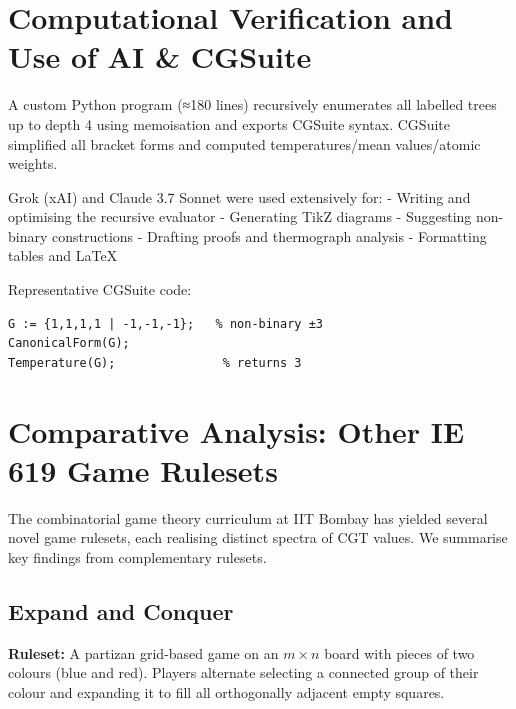 \documentclass[10pt,a4paper,twocolumn]{article}
\theoremstyle{plain}
\theoremstyle{definition}
\theoremstyle{remark}
\begin{document}
\section{Computational Verification and Use of AI \& CGSuite}

A custom Python program (≈180 lines) recursively enumerates all labelled trees up to depth 4 using memoisation and exports CGSuite syntax. CGSuite simplified all bracket forms and computed temperatures/mean values/atomic weights.

Grok (xAI) and Claude 3.7 Sonnet were used extensively for:
- Writing and optimising the recursive evaluator
- Generating TikZ diagrams
- Suggesting non-binary constructions
- Drafting proofs and thermograph analysis
- Formatting tables and LaTeX

Representative CGSuite code:
\begin{verbatim}
G := {1,1,1,1 | -1,-1,-1};   % non-binary ±3
CanonicalForm(G);
Temperature(G);               % returns 3
\end{verbatim}

\section{Comparative Analysis: Other IE 619 Game Rulesets}

The combinatorial game theory curriculum at IIT Bombay has yielded several novel game rulesets, each realising distinct spectra of CGT values. We summarise key findings from complementary rulesets.

\subsection{Expand and Conquer}

\textbf{Ruleset:} A partizan grid-based game on an $m \times n$ board with pieces of two colours (blue and red). Players alternate selecting a connected group of their colour and expanding it to fill all orthogonally adjacent empty squares.

\end{document}

